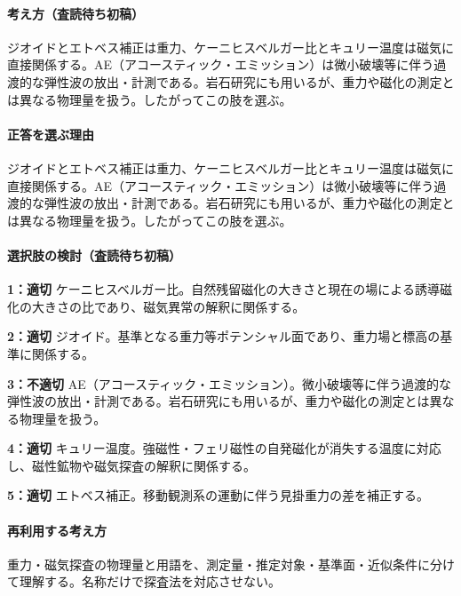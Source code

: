 \paragraph{考え方（査読待ち初稿）} ジオイドとエトベス補正は重力、ケーニヒスベルガー比とキュリー温度は磁気に直接関係する。AE（アコースティック・エミッション）は微小破壊等に伴う過渡的な弾性波の放出・計測である。岩石研究にも用いるが、重力や磁化の測定とは異なる物理量を扱う。したがってこの肢を選ぶ。

\paragraph{正答を選ぶ理由} ジオイドとエトベス補正は重力、ケーニヒスベルガー比とキュリー温度は磁気に直接関係する。AE（アコースティック・エミッション）は微小破壊等に伴う過渡的な弾性波の放出・計測である。岩石研究にも用いるが、重力や磁化の測定とは異なる物理量を扱う。したがってこの肢を選ぶ。

\paragraph{選択肢の検討（査読待ち初稿）}\mbox{}\par

\noindent\textbf{1：適切} ケーニヒスベルガー比。自然残留磁化の大きさと現在の場による誘導磁化の大きさの比であり、磁気異常の解釈に関係する。\par

\noindent\textbf{2：適切} ジオイド。基準となる重力等ポテンシャル面であり、重力場と標高の基準に関係する。\par

\noindent\textbf{3：不適切} AE（アコースティック・エミッション）。微小破壊等に伴う過渡的な弾性波の放出・計測である。岩石研究にも用いるが、重力や磁化の測定とは異なる物理量を扱う。\par

\noindent\textbf{4：適切} キュリー温度。強磁性・フェリ磁性の自発磁化が消失する温度に対応し、磁性鉱物や磁気探査の解釈に関係する。\par

\noindent\textbf{5：適切} エトベス補正。移動観測系の運動に伴う見掛重力の差を補正する。\par

\paragraph{再利用する考え方} 重力・磁気探査の物理量と用語を、測定量・推定対象・基準面・近似条件に分けて理解する。名称だけで探査法を対応させない。


